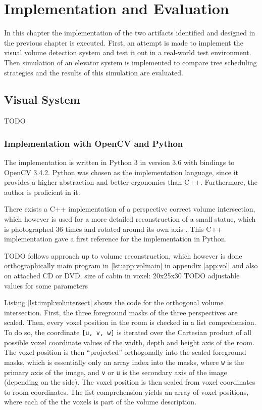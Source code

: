 \chapter{Implementation and Evaluation}
\label{chap:impl}

In this chapter the implementation of the two artifacts identified and designed in the previous chapter is executed.
First, an attempt is made to implement the visual volume detection system and test it out in a real-world test environment.
Then simulation of an elevator system is implemented to compare tree scheduling strategies and the results of this simulation are evaluated.


\section{Visual System}
TODO
\subsection{Implementation with OpenCV and Python}

The implementation is written in Python 3 in version 3.6 \autocite[][]{python2018python366}
with bindings to OpenCV 3.4.2.
Python was chosen as the implementation language, since it provides a higher abstraction and better ergonomics than C++.
Furthermore, the author is proficient in it.

There exists a C++ implementation of a perspective correct volume intersection, which however is used for a more detailed reconstruction of a small statue, which is photographed 36 times and rotated around its own axis \autocite[][]{xocoatzin2013voxelcarving}.
This C++ implementation gave a first reference for the implementation in Python.

TODO
follows approach up to volume reconstruction, which however is done orthographically
main program in \ref{lst:app:volmain} in appendix \ref{app:vol} and also on attached CD or DVD.
size of cabin in voxel: 20x25x30
TODO
adjustable values for some parameters

Listing \ref{lst:impl:volintersect} shows the code for the orthogonal volume intersection.
First, the three  foreground masks of the three perspectives are scaled.
Then, every voxel position in the room is checked in a list comprehension.
To do so, the coordinate \texttt{[u, v, w]} is iterated over the Cartesian product 
of all possible voxel coordinate values of the width, depth and height axis of the room.
The voxel position is then \enquote{projected} orthogonally into the scaled foreground masks, which is essentially only an array index into the masks, where \texttt{w} is the primary axis of the image, and \texttt{v} or \texttt{u} is the secondary axis of the image (depending on the side).
The voxel position is then scaled from voxel coordinates to room coordinates.
The list comprehension yields an array of voxel positions, where each of the the voxels is part of the volume description.


